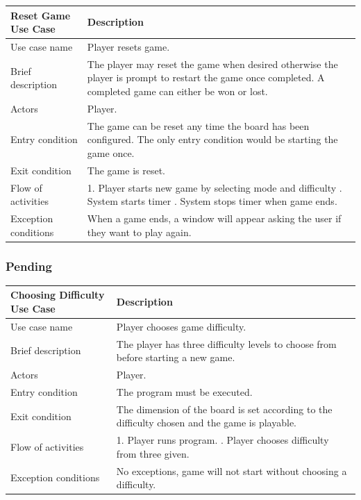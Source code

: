 \documentclass[12pt, a4]{report}
\begin{document}
	\begin{table}[ht]
	\begin{tabular}{|p{4cm}|p{12cm}|}
		\hline
		Reset Game Use Case & Description \\
		\hline
		Use case name & Player resets game. \\
		Brief description & The player may reset the game when desired otherwise the player is prompt to restart the game once completed. A completed game can either be won or lost. \\
		Actors & Player. \\
		Entry condition & The game can be reset any time the board has been configured. The only entry condition would be starting the game once. \\
		Exit condition & The game is reset. \\
		Flow of activities & 1. Player starts new game by selecting mode and difficulty \newline 2. System starts timer \newline 3. System stops timer when game ends. \\
		Exception conditions & When a game ends, a window will appear asking the user if they want to play again.\\
		\hline
	\end{tabular}
	\end{table}
	\pagebreak
	\subsubsection{Pending}
	\begin{table}[ht]
		\begin{tabular}{|p{4cm}|p{12cm}|}
			\hline
			Choosing Difficulty Use Case & Description \\
			\hline
			Use case name & Player chooses game difficulty. \\
			Brief description & The player has three difficulty levels to choose from before starting a new game. \\
			Actors & Player. \\
			Entry condition & The program must be executed. \\
			Exit condition & The dimension of the board is set according to the difficulty chosen and the game is playable. \\
			Flow of activities & 1. Player runs program. \newline 2. Player chooses difficulty from three given.\\
			Exception conditions & No exceptions, game will not start without choosing a difficulty.\\
			\hline
		\end{tabular}
	\end{table}
	\pagebreak
	
\end{document}
